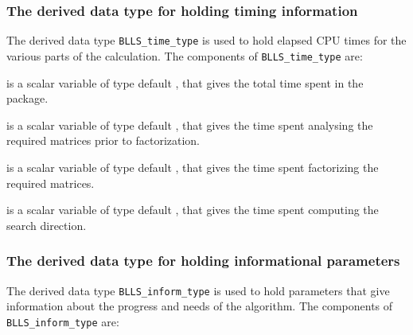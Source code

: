 \documentclass{galahad}
\newcommand{\packagename}{BLLS}
\begin{document}
\subsubsection{The derived data type for holding timing
 information}\label{typetime}
The derived data type
{\tt \packagename\_time\_type}
is used to hold elapsed CPU times for the various parts of the calculation.
The components of
{\tt \packagename\_time\_type}
are:
\begin{description}
 is a scalar variable of type default \real, that gives
 the total time spent in the package.

 is a scalar variable of type default \real, that gives
 the time spent analysing the required matrices prior to factorization.

 is a scalar variable of type default \real, that gives
 the time spent factorizing the required matrices.

 is a scalar variable of type default \real, that gives
 the time spent computing the search direction.

\end{description}


\subsubsection{The derived data type for holding informational
 parameters}\label{typeinform}
The derived data type
{\tt \packagename\_inform\_type}
is used to hold parameters that give information about the progress and needs
of the algorithm. The components of
{\tt \packagename\_inform\_type}
are:
\end{document}
